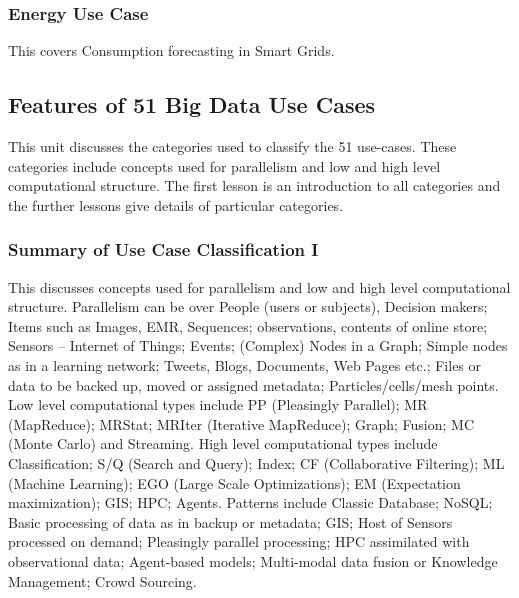 


\subsubsection{Energy Use Case}\label{energy-use-case}

This covers Consumption forecasting in Smart Grids.





\subsection{Features of 51 Big Data Use
Cases}\label{features-of-51-big-data-use-cases}

This unit discusses the categories used to classify the 51 use-cases.
These categories include concepts used for parallelism and low and high
level computational structure. The first lesson is an introduction to
all categories and the further lessons give details of particular
categories.




\subsubsection{Summary of Use Case Classification
I}\label{summary-of-use-case-classification-i}

This discusses concepts used for parallelism and low and high level
computational structure. Parallelism can be over People (users or
subjects), Decision makers; Items such as Images, EMR, Sequences;
observations, contents of online store; Sensors -- Internet of Things;
Events; (Complex) Nodes in a Graph; Simple nodes as in a learning
network; Tweets, Blogs, Documents, Web Pages etc.; Files or data to be
backed up, moved or assigned metadata; Particles/cells/mesh points. Low
level computational types include PP (Pleasingly Parallel); MR
(MapReduce); MRStat; MRIter (Iterative MapReduce); Graph; Fusion; MC
(Monte Carlo) and Streaming. High level computational types include
Classification; S/Q (Search and Query); Index; CF (Collaborative
Filtering); ML (Machine Learning); EGO (Large Scale Optimizations); EM
(Expectation maximization); GIS; HPC; Agents. Patterns include Classic
Database; NoSQL; Basic processing of data as in backup or metadata; GIS;
Host of Sensors processed on demand; Pleasingly parallel processing; HPC
assimilated with observational data; Agent-based models; Multi-modal
data fusion or Knowledge Management; Crowd Sourcing.


